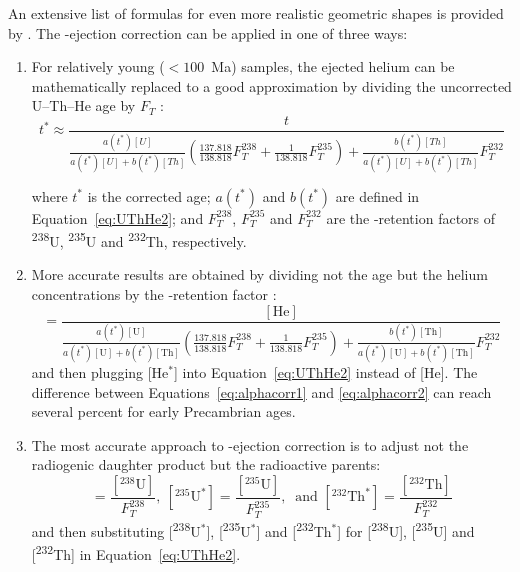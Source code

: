 \begin{refsection}
An extensive list of formulas for even more realistic geometric shapes
is provided by \citet{ketcham2011}. The \textalpha-ejection correction
can be applied in one of three ways:

\begin{enumerate}
\item For relatively young ($<100$~Ma) samples, the ejected helium can
  be mathematically replaced to a good approximation by dividing the
  uncorrected U--Th--He age by $F_T$ \citet{farley2002}:
  \begin{equation}
    t^* \approx \frac{t}{
      \frac{a(t^*)[U]}{a(t^*)[U]+b(t^*)[Th]}
      \left(
      \frac{137.818}{138.818} F_T^{238} +
      \frac{1}{138.818} F_T^{235}
      \right) + 
      \frac{b(t^*)[Th]}{a(t^*)[U]+b(t^*)[Th]} F_T^{232}
    }
    \label{eq:alphacorr1}
  \end{equation}

  \noindent where $t^*$ is the corrected age; $a(t^*)$ and $b(t^*)$ are
  defined in Equation~\ref{eq:UThHe2}; and $F_T^{238}$, $F_T^{235}$
  and $F_T^{232}$ are the \textalpha-retention factors of
  \textsuperscript{238}U, \textsuperscript{235}U and
  \textsuperscript{232}Th, respectively.
\item More accurate results are obtained by dividing not the age but
  the helium concentrations by the \textalpha-retention factor
  \citep{min2003, vermeesch2008a}:
  \begin{equation}
    [\mbox{He}^*] = \frac{[\mbox{He}]}{
      \frac{a(t^*)[\mbox{U}]}{a(t^*)[\mbox{U}]+b(t^*)[\mbox{Th}]}
      \left(
      \frac{137.818}{138.818} F_T^{238} +
      \frac{1}{138.818} F_T^{235}
      \right) + 
      \frac{b(t^*)[\mbox{Th}]}{a(t^*)[\mbox{U}]+b(t^*)[\mbox{Th}]} F_T^{232}
    }
    \label{eq:alphacorr2}
  \end{equation}
  \noindent and then plugging [He$^*$] into Equation~\ref{eq:UThHe2}
  instead of [He]. The difference between
  Equations~\ref{eq:alphacorr1} and \ref{eq:alphacorr2} can reach
  several percent for early Precambrian ages.
\item The most accurate approach to \textalpha-ejection correction is to
  adjust not the radiogenic daughter product but the radioactive
  parents:
  \begin{equation}
      [{}^{238}\mbox{U}^*] = \frac{[{}^{238}\mbox{U}]}{F_T^{238}},~
      [{}^{235}\mbox{U}^*] = \frac{[{}^{235}\mbox{U}]}{F_T^{235}},~
      \mbox{~and~} [{}^{232}\mbox{Th}^*] =
      \frac{[{}^{232}\mbox{Th}]}{F_T^{232}}
    \label{eq:alphacorr3}
  \end{equation}
  \noindent and then substituting [\textsuperscript{238}U$^*$],
            [\textsuperscript{235}U$^*$] and [\textsuperscript{232}Th$^*$]
            for [\textsuperscript{238}U], [\textsuperscript{235}U] and
            [\textsuperscript{232}Th] in Equation~\ref{eq:UThHe2}.
\end{enumerate}


\end{refsection}
